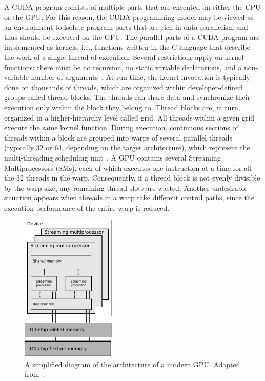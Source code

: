 A CUDA program consists of multiple parts that are executed on either
the CPU or the GPU. For this reason, the CUDA programming model may
be viewed as an environment to isolate program parts that are rich
in data parallelism and thus should be executed on the GPU. The parallel
parts of a CUDA program are implemented as kernels, i.e., functions
written in the C language that describe the work of a single thread
of execution. Several restrictions apply on kernel functions: there
must be no recursion, no static variable declarations, and a non-variable
number of arguments~\cite{Ryoo-Optimization_principles_of_a_GPU_using_CUDA:2008}.
At run time, the kernel invocation is typically done on thousands
of threads, which are organized within developer-defined groups called
thread blocks. The threads can share data and synchronize their execution
only within the block they belong to. Thread blocks are, in turn,
organized in a higher-hierarchy level called grid. All threads within
a given grid execute the same kernel function. During execution, continuous
sections of threads within a block are grouped into warps of several
parallel threads (typically 32 or 64, depending on the target architecture),
which represent the multi-threading scheduling unit~\cite{Ryoo-Optimization_principles_of_a_GPU_using_CUDA:2008}.
A GPU contains several Streaming Multiprocessors (SMs),
each of which executes one instruction at a time for all the 32 threads
in the warp. Consequently, if a thread block is not evenly divisible
by the warp size, any remaining thread slots are wasted. Another undesirable
situation appears when threads in a warp take different control paths,
since the execution performance of the entire warp is reduced.

\begin{figure}
\centering

\includegraphics[width=0.4\textwidth]{02-background_and_motivation/img/GPU_architecture}

\caption{A simplified diagram of the architecture of a modern GPU. Adapted
from~\cite{Ryoo-Optimization_principles_of_a_GPU_using_CUDA:2008}.\label{fig:02-GPU_architecture}}
\end{figure}


